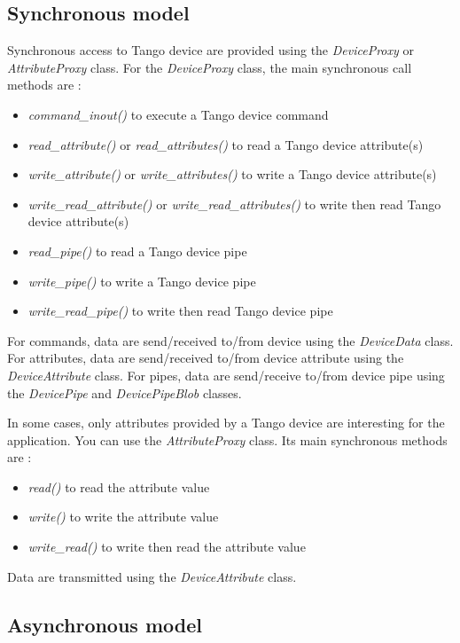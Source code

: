 \subsection{Synchronous model}

Synchronous access to Tango device are provided using the \emph{DeviceProxy}
or \emph{AttributeProxy} class. For the \emph{DeviceProxy} class,
the main synchronous call methods are :
\begin{itemize}
\item \emph{command\_inout()} to execute a Tango device command
\item \emph{read\_attribute()} or \emph{read\_attributes()} to read a Tango
device attribute(s)
\item \emph{write\_attribute()} or \emph{write\_attributes()} to write a
Tango device attribute(s)
\item \emph{write\_read\_attribute()} or \emph{write\_read\_attributes()}
to write then read Tango device attribute(s)
\item \emph{read\_pipe()} to read a Tango device pipe
\item \emph{write\_pipe()} to write a Tango device pipe
\item \emph{write\_read\_pipe()} to write then read Tango device pipe
\end{itemize}
For commands, data are send/received to/from device using the \emph{DeviceData}
class. For attributes, data are send/received to/from device attribute
using the \emph{DeviceAttribute} class. For pipes, data are send/receive
to/from device pipe using the \emph{DevicePipe}
and \emph{DevicePipeBlob} classes.

In some cases, only attributes provided by a Tango device are interesting
for the application. You can use the \emph{AttributeProxy} class.
Its main synchronous methods are :
\begin{itemize}
\item \emph{read()} to read the attribute value
\item \emph{write()} to write the attribute value
\item \emph{write\_read()} to write then read the attribute value
\end{itemize}
Data are transmitted using the \emph{DeviceAttribute} class.


\subsection{Asynchronous model}

